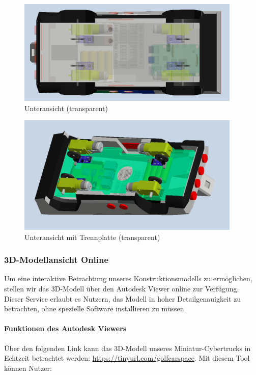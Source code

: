 \newpage

\begin{figure}[h]
    \centering
    \includegraphics[width=0.95\textwidth]{Resources/unten_transparent.png}
    \caption{Unteransicht (transparent)}
\end{figure}

\begin{figure}[h]
    \centering
    \includegraphics[width=0.95\textwidth]{Resources/unten_trennplatte_transparent.png}
    \caption{Unteransicht mit Trennplatte (transparent)}
\end{figure}

\newpage

\subsubsection{3D-Modellansicht Online}
Um eine interaktive Betrachtung unseres Konstruktionsmodells zu ermöglichen, stellen wir das 3D-Modell über den Autodesk Viewer online zur Verfügung. Dieser Service erlaubt es Nutzern, das Modell in hoher Detailgenauigkeit zu betrachten, ohne spezielle Software installieren zu müssen.

\paragraph{Funktionen des Autodesk Viewers}
Über den folgenden Link kann das 3D-Modell unseres Miniatur-Cybertrucks in Echtzeit betrachtet werden: \newline \url{https://tinyurl.com/golfcarspace}.
\newline
Mit diesem Tool können Nutzer:

